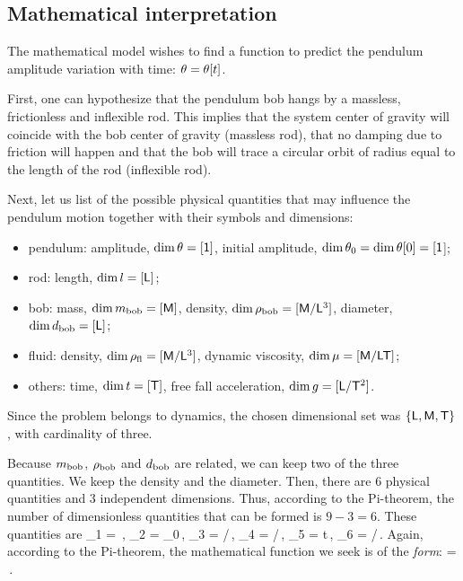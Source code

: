\subsection{Mathematical interpretation}
The mathematical model wishes to find a function to predict the pendulum amplitude variation with time: $\theta = \theta\!\left[{t}\right]$.

First, one can hypothesize that the pendulum bob hangs by a massless, frictionless and inflexible rod. This implies that the system center of gravity will coincide with the bob center of gravity (massless rod), that no damping due to friction will happen and that the bob will trace a circular orbit of radius equal to the length of the rod (inflexible rod).

Next, let us list of the possible physical quantities that may influence the pendulum motion together with their symbols and dimensions:
\begin{itemize}
%
\item pendulum: amplitude, $\dim\theta = [\mathsf{1}]$, initial amplitude, $\dim\theta_0 = \dim\theta\!\left[{0}\right] = [\mathsf{1}$];
%
\item rod: length, $\dim l = [\mathsf{L}]$;
%
\item bob: mass, $\dim m_\text{bob} = [\mathsf{M}]$, density, $\dim\rho_\text{bob} = [\mathsf{M}/\mathsf{L}^3]$, diameter, $\dim d_\text{bob} = [\mathsf{L}]$;
%
\item fluid: density, $\dim\rho_\text{fl} = [\mathsf{M}/\mathsf{L}^3]$, dynamic viscosity, $\dim\mu = [\mathsf{M}/\mathsf{L}\mathsf{T}]$;
%
\item others: time, $\dim t = [\mathsf{T}]$, free fall acceleration, $\dim g = [\mathsf{L}/\mathsf{T}^2]$.
%
\end{itemize}
Since the problem belongs to dynamics, the chosen dimensional set was $\left\lbrace{\mathsf{L}, \mathsf{M}, \mathsf{T}}\right\rbrace$, with cardinality of three.

Because $m_\text{bob}$, $\rho_\text{bob}$ and $d_\text{bob}$ are related, we can keep two of the three quantities. We keep the density and the diameter. Then, there are 6 physical quantities and 3 independent dimensions. Thus, according to the Pi-theorem, the number of dimensionless quantities that can be formed is $9 - 3 = 6$. These quantities are
\beq
\kdim_1 = \theta\,,\quad
\kdim_2 = \theta_0\,,\quad
\kdim_3 = \diam/\length\,,\quad
\kdim_4 = \dens{}/\dens{}\,,\quad
\kdim_5 = t\sqrt{\grav/\length}\,,\quad
\kdim_6 = \dens{}\diam\sqrt{\length\grav}/\dynvis\,.
\eeq
Again, according to the Pi-theorem, the mathematical function we seek is of the \emph{form}:
\beq
\theta = \kdimf{}\,.
\eeq

